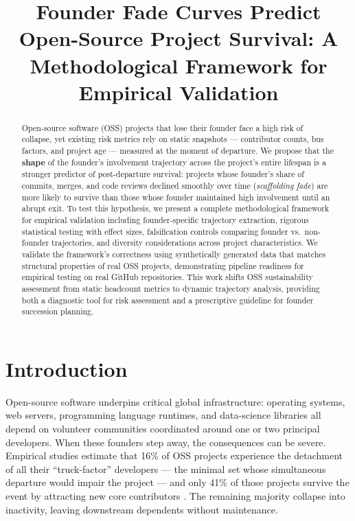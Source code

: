 \documentclass[11pt,letterpaper]{article}
\title{Founder Fade Curves Predict Open-Source Project Survival: A Methodological Framework for Empirical Validation}
\author{}
\date{}
\begin{document}
\maketitle

\begin{abstract}
Open-source software (OSS) projects that lose their founder face a high risk of collapse, yet existing risk metrics rely on static snapshots --- contributor counts, bus factors, and project age --- measured at the moment of departure. We propose that the \textbf{shape} of the founder's involvement trajectory across the project's entire lifespan is a stronger predictor of post-departure survival: projects whose founder's share of commits, merges, and code reviews declined smoothly over time (\textit{scaffolding fade}) are more likely to survive than those whose founder maintained high involvement until an abrupt exit. To test this hypothesis, we present a complete methodological framework for empirical validation including founder-specific trajectory extraction, rigorous statistical testing with effect sizes, falsification controls comparing founder vs.\ non-founder trajectories, and diversity considerations across project characteristics. We validate the framework's correctness using synthetically generated data that matches structural properties of real OSS projects, demonstrating pipeline readiness for empirical testing on real GitHub repositories. This work shifts OSS sustainability assessment from static headcount metrics to dynamic trajectory analysis, providing both a diagnostic tool for risk assessment and a prescriptive guideline for founder succession planning.
\end{abstract}

\section{Introduction}

Open-source software underpins critical global infrastructure: operating systems, web servers, programming language runtimes, and data-science libraries all depend on volunteer communities coordinated around one or two principal developers. When these founders step away, the consequences can be severe. Empirical studies estimate that 16\% of OSS projects experience the detachment of all their ``truck-factor'' developers --- the minimal set whose simultaneous departure would impair the project --- and only 41\% of those projects survive the event by attracting new core contributors \citep{Avelino2019}. The remaining majority collapse into inactivity, leaving downstream dependents without maintenance.
\end{document}
